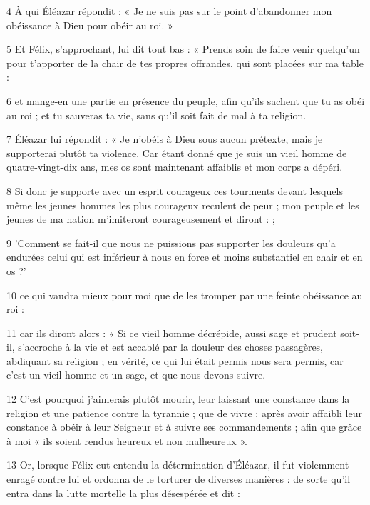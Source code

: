 \par 4 À qui Éléazar répondit : « Je ne suis pas sur le point d’abandonner mon obéissance à Dieu pour obéir au roi. »

\par 5 Et Félix, s'approchant, lui dit tout bas : « Prends soin de faire venir quelqu'un pour t'apporter de la chair de tes propres offrandes, qui sont placées sur ma table :

\par 6 et mange-en une partie en présence du peuple, afin qu'ils sachent que tu as obéi au roi ; et tu sauveras ta vie, sans qu'il soit fait de mal à ta religion.

\par 7 Éléazar lui répondit : « Je n'obéis à Dieu sous aucun prétexte, mais je supporterai plutôt ta violence. Car étant donné que je suis un vieil homme de quatre-vingt-dix ans, mes os sont maintenant affaiblis et mon corps a dépéri.

\par 8 Si donc je supporte avec un esprit courageux ces tourments devant lesquels même les jeunes hommes les plus courageux reculent de peur ; mon peuple et les jeunes de ma nation m'imiteront courageusement et diront : ;

\par 9 'Comment se fait-il que nous ne puissions pas supporter les douleurs qu'a endurées celui qui est inférieur à nous en force et moins substantiel en chair et en os ?'

\par 10 ce qui vaudra mieux pour moi que de les tromper par une feinte obéissance au roi :

\par 11 car ils diront alors : « Si ce vieil homme décrépide, aussi sage et prudent soit-il, s'accroche à la vie et est accablé par la douleur des choses passagères, abdiquant sa religion ; en vérité, ce qui lui était permis nous sera permis, car c'est un vieil homme et un sage, et que nous devons suivre.

\par 12 C'est pourquoi j'aimerais plutôt mourir, leur laissant une constance dans la religion et une patience contre la tyrannie ; que de vivre ; après avoir affaibli leur constance à obéir à leur Seigneur et à suivre ses commandements ; afin que grâce à moi « ils soient rendus heureux et non malheureux ».

\par 13 Or, lorsque Félix eut entendu la détermination d'Éléazar, il fut violemment enragé contre lui et ordonna de le torturer de diverses manières : de sorte qu'il entra dans la lutte mortelle la plus désespérée et dit :

